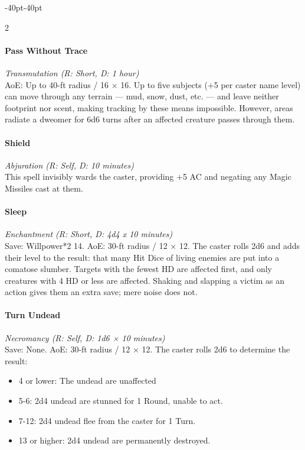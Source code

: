 \documentclass{book}
\providecommand{\tightlist}{%
\setlength{\itemsep}{0pt}\setlength{\parskip}{0pt}}
\begin{document}
\begin{adjustwidth}{-40pt}{-40pt}
\begin{multicols}{2}
\paragraph{Pass Without Trace}\label{pass-without-trace}
\emph{Transmutation (R: Short, D: 1 hour)}\\
AoE: Up to 40-ft radius / 16 × 16. Up to five subjects (+5 per caster
name level) can move through any terrain --- mud, snow, dust, etc. ---
and leave neither footprint nor scent, making tracking by these means
impossible. However, areas radiate a dweomer for 6d6 turns after an
affected creature passes through them.

\paragraph{Shield}\label{shield}
\emph{Abjuration (R: Self, D: 10 minutes)}\\
This spell invisibly wards the caster, providing +5 AC and negating any
Magic Missiles cast at them.

\paragraph{Sleep}\label{sleep}
\emph{Enchantment (R: Short, D: 4d4 x 10 minutes)}\\
Save: Willpower*2 14. AoE: 30-ft radius / 12 × 12. The caster rolls 2d6
and adds their level to the result: that many Hit Dice of living enemies
are put into a comatose slumber. Targets with the fewest HD are affected
first, and only creatures with 4 HD or less are affected. Shaking and
slapping a victim as an action gives them an extra save; mere noise does
not.

\paragraph{Turn Undead}\label{turn-undead}
\emph{Necromancy (R: Self, D: 1d6 × 10 minutes)}\\
Save: None. AoE: 30-ft radius / 12 × 12. The caster rolls 2d6 to
determine the result:

\begin{itemize}
	\tightlist
	\item
	4 or lower: The undead are unaffected
	\item
	5-6: 2d4 undead are stunned for 1 Round, unable to act.
	\item
	7-12: 2d4 undead flee from the caster for 1 Turn.
	\item
	13 or higher: 2d4 undead are permanently destroyed.
\end{itemize}


\end{multicols}
\end{adjustwidth}
\end{document}
